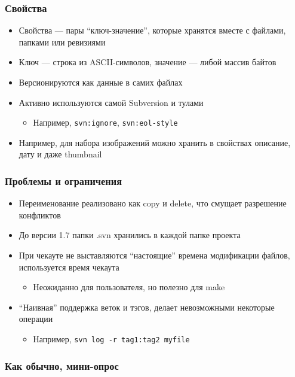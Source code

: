 \documentclass[xetex,mathserif,serif]{beamer}
\begin{document}
	\begin{frame}[fragile]
		\frametitle{Свойства}
		\begin{itemize}
			\item Свойства --- пары ``ключ-значение'', которые хранятся вместе с файлами, папками или ревизиями
			\item Ключ --- строка из ASCII-символов, значение --- либой массив байтов
			\item Версионируются как данные в самих файлах
			\item Активно используются самой Subversion и тулами
			\begin{itemize}
				\item Например, \verb|svn:ignore|, \verb|svn:eol-style|
			\end{itemize}
			\item Например, для набора изображений можно хранить в свойствах описание, дату и даже thumbnail
		\end{itemize}
	\end{frame}

	\begin{frame}[fragile]
		\frametitle{Проблемы и ограничения}
		\begin{itemize}
			\item Переименование реализовано как copy и delete, что смущает разрешение конфликтов
			\item До версии 1.7 папки .svn хранились в каждой папке проекта
			\item При чекауте не выставляются ``настоящие'' времена модификации файлов, используется время чекаута
			\begin{itemize}
				\item Неожиданно для пользователя, но полезно для make
			\end{itemize}
			\item ``Наивная'' поддержка веток и тэгов, делает невозможными некоторые операции
			\begin{itemize}
				\item Например, \verb|svn log -r tag1:tag2 myfile|
			\end{itemize}
		\end{itemize}
	\end{frame}

	\begin{frame}
		\frametitle{Как обычно, мини-опрос}
	\end{frame}
\end{document}
